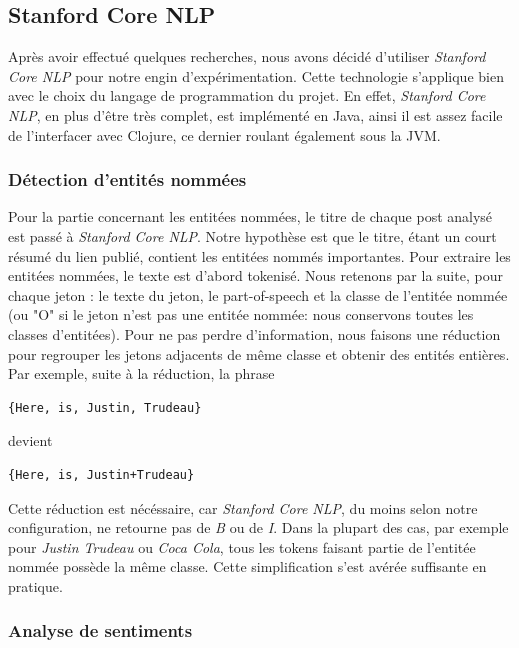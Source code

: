 \documentclass[12pt]{article}
\begin{document}
\subsection{Stanford Core NLP}

Après avoir effectué quelques recherches, nous avons décidé d'utiliser \textit{Stanford Core NLP} pour notre engin d'expérimentation. Cette technologie s'applique bien avec le choix du langage de programmation du projet. En effet, \textit{Stanford Core NLP}, en plus d'être très complet, est implémenté en Java, ainsi il est assez facile de l'interfacer avec Clojure, ce dernier roulant également sous la JVM.

\subsubsection{Détection d'entités nommées}
\label{sec:named-entities}

Pour la partie concernant les entitées nommées, le titre de chaque post analysé est passé à \textit{Stanford Core NLP}. Notre hypothèse est que le titre, étant un court
résumé du lien publié, contient les entitées nommés importantes.
Pour extraire les entitées nommées, le texte est d'abord tokenisé. Nous retenons par la suite, pour chaque jeton : le texte du jeton, le part-of-speech et la classe de l'entitée nommée (ou "O" si le jeton n'est pas une entitée nommée: nous conservons toutes les classes d'entitées). Pour ne pas perdre d'information, nous faisons une réduction pour regrouper les jetons adjacents de même classe et obtenir des entités entières. Par exemple, suite à la réduction, la phrase

\begin{verbatim}
{Here, is, Justin, Trudeau}
\end{verbatim}

devient

\begin{verbatim}
{Here, is, Justin+Trudeau}
\end{verbatim}

Cette réduction est nécéssaire, car \textit{Stanford Core NLP}, du moins selon notre configuration, ne retourne pas de \textit{B} ou de \textit{I}.
Dans la plupart des cas, par exemple pour \emph{Justin Trudeau} ou \emph{Coca Cola}, tous les tokens faisant partie de l'entitée nommée possède la même
classe. Cette simplification s'est avérée suffisante en pratique.

\subsubsection{Analyse de sentiments}
\label{sec:sentiment-analysis}
\end{document}
